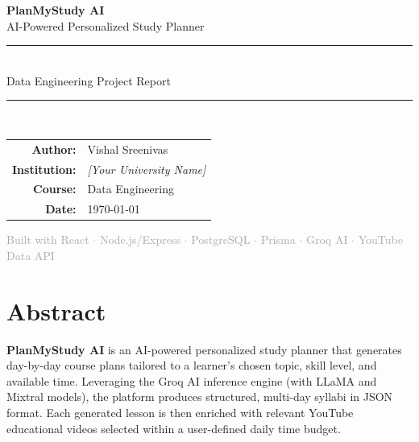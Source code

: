 \documentclass[12pt,a4paper]{report}
\begin{document}
\begin{titlepage}
    \centering
    \vspace*{1.5cm}

    {\Huge\bfseries\textcolor{primaryblue}{PlanMyStudy AI}}\\[0.5cm]
    {\Large\textcolor{accentgold}{AI-Powered Personalized Study Planner}}\\[1cm]

    \rule{\textwidth}{1.5pt}\\[0.5cm]
    {\large Data Engineering Project Report}\\[0.3cm]
    \rule{\textwidth}{1.5pt}\\[2cm]


    \vspace{1.5cm}

    {\large
    \begin{tabular}{rl}
        \textbf{Author:}      & Vishal Sreenivas \\[0.3cm]
        \textbf{Institution:} & \textit{[Your University Name]} \\[0.3cm]
        \textbf{Course:}      & Data Engineering \\[0.3cm]
        \textbf{Date:}        & \today \\
    \end{tabular}}

    \vfill
    {\small\textcolor{darkgray}{Built with React $\cdot$ Node.js/Express $\cdot$ PostgreSQL $\cdot$ Prisma $\cdot$ Groq AI $\cdot$ YouTube Data API}}
\end{titlepage}

\chapter*{Abstract}

\textbf{PlanMyStudy AI} is an AI-powered personalized study planner that generates day-by-day course plans tailored to a learner's chosen topic, skill level, and available time. Leveraging the Groq AI inference engine (with LLaMA and Mixtral models), the platform produces structured, multi-day syllabi in JSON format. Each generated lesson is then enriched with relevant YouTube educational videos selected within a user-defined daily time budget.
\end{document}
